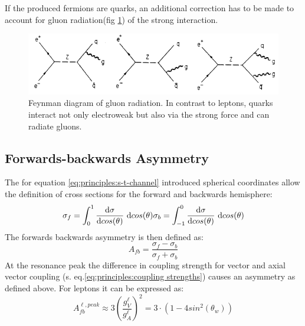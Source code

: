 If the produced fermions are quarks,  an additional correction has to be made to account for gluon radiation(fig \ref{fig:principles:QCDkorrektur}) of the strong interaction.
\begin{figure}[H]
\centering
\includegraphics[width=1.0\linewidth]{graphics/QCDkorrektur}
\caption[Feynman daigram: gluon radiation]{Feynman diagram of gluon radiation. In contrast to leptons, quarks interact not only electroweak but also via the strong force and can radiate gluons.\cite{muenchen}}
\label{fig:principles:QCDkorrektur}
\end{figure}
\subsection{Forwards-backwards Asymmetry}
The for equation \ref{eq:principles:s-t-channel} introduced spherical coordinates allow the definition of cross sections for the forward and backwards hemisphere:
\begin{equation}
\sigma_f=\int_{0}^{1}\frac{\text{d}\sigma}{\text{d}cos(\theta)}~\text{d}cos(\theta) \\
\sigma_b=\int_{-1}^{0}\frac{\text{d}\sigma}{\text{d}cos(\theta)}~\text{d}cos(\theta)
\label{eq:principles:fbintegral}
\end{equation}
The forwards backwards asymmetry is then defined as:
\begin{equation}
A_{fb}=\frac{\sigma_f-\sigma_b}{\sigma_f+\sigma_b}
\label{eq:principles:asymmetry definition}
\end{equation}
At the resonance peak the difference in coupling strength for vector and axial vector coupling (s. eq.\ref{eq:principles:coupling strengths}) causes an asymmetry as defined above. For leptons it can be expressed as:
\begin{equation}
A_{fb}^{\ell,peak}\approx 3 \left ( \frac{g^{\ell}_V}{g^{\ell}_A} \right )^2=3\cdot (1-4 sin^2(\theta_w))
\label{eq:principles:asymmetry weinberg angle}
\end{equation}